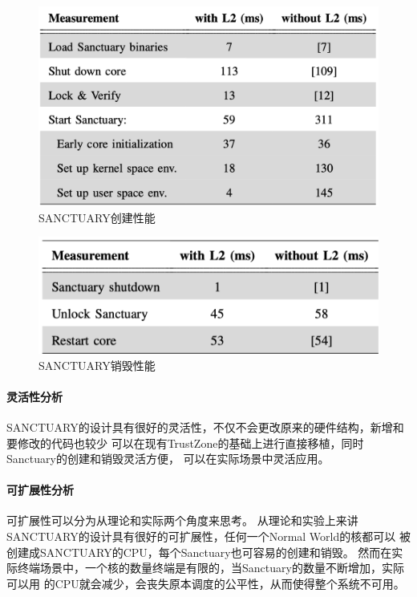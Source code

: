 \begin{figure}
    \centering
    \includegraphics[scale=0.45]{Figures/trustzone/setup.png}
    \decoRule
    \caption{SANCTUARY创建性能}
    \label{fig:setup}
\end{figure}

\begin{figure}
    \centering
    \includegraphics[scale=0.45]{Figures/trustzone/teardown.png}
    \decoRule
    \caption{SANCTUARY销毁性能}
    \label{fig:teardown}
\end{figure}

\paragraph{灵活性分析}
SANCTUARY的设计具有很好的灵活性，不仅不会更改原来的硬件结构，新增和要修改的代码也较少
可以在现有TrustZone的基础上进行直接移植，同时Sanctuary的创建和销毁灵活方便，
可以在实际场景中灵活应用。

\paragraph{可扩展性分析}
可扩展性可以分为从理论和实际两个角度来思考。
从理论和实验上来讲SANCTUARY的设计具有很好的可扩展性，任何一个Normal World的核都可以
被创建成SANCTUARY的CPU，每个Sanctuary也可容易的创建和销毁。
然而在实际终端场景中，一个核的数量终端是有限的，当Sanctuary的数量不断增加，实际可以用
的CPU就会减少，会丧失原本调度的公平性，从而使得整个系统不可用。


